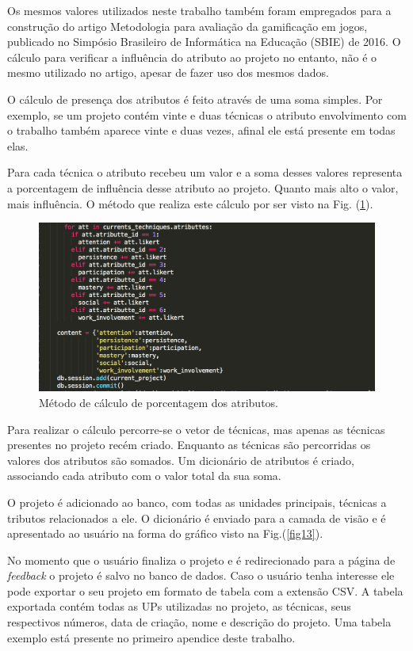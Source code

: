 Os mesmos valores utilizados neste trabalho também foram empregados para a construção do artigo Metodologia para avaliação da gamificação em jogos, publicado no Simpósio Brasileiro de Informática na Educação (SBIE) de 2016. O cálculo para verificar a influência do atributo ao projeto no entanto, não é o mesmo utilizado no artigo, apesar de fazer uso dos mesmos dados.


O cálculo de presença dos atributos é feito através de uma soma simples. Por exemplo, se um projeto contém vinte e duas técnicas o atributo envolvimento com o trabalho também aparece vinte e duas vezes, afinal ele está presente em todas elas. 

Para cada técnica o atributo recebeu um valor e a soma desses valores representa a porcentagem de influência desse atributo ao projeto. Quanto mais alto o valor, mais influência. O método que realiza este cálculo por ser visto na Fig. (\ref{fig14}).


\begin{figure}[h]
	\centering
		\includegraphics[keepaspectratio=true,scale=0.6]{figuras/att.png}
	\caption{Método de cálculo de porcentagem dos atributos.\label{fig14}}
\end{figure}


Para realizar o cálculo percorre-se o vetor de técnicas, mas apenas as técnicas presentes no projeto recém criado. Enquanto as técnicas são percorridas os valores dos atributos são somados. Um dicionário de atributos é criado, associando cada atributo com o valor total da sua soma.

 O projeto é adicionado ao banco, com todas as unidades principais, técnicas a tributos relacionados a ele. O dicionário é enviado para a camada de visão e é apresentado ao usuário na forma do gráfico visto na  Fig.(\ref{fig13}).

No momento que o usuário finaliza o projeto e é redirecionado para a página de \textit{feedback} o projeto é salvo no banco de dados. Caso o usuário tenha interesse ele pode exportar o seu projeto em formato de tabela com a extensão CSV. A tabela exportada contém todas as UPs utilizadas no projeto, as técnicas, seus respectivos números, data de criação, nome e descrição do projeto. Uma tabela exemplo está presente no primeiro apendice deste trabalho.

